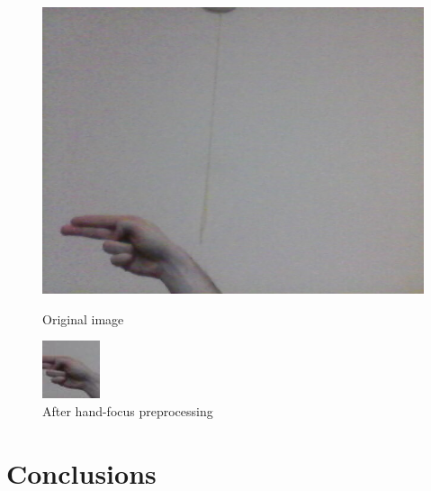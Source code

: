 \documentclass[10pt,twocolumn,letterpaper]{article}
\begin{document}
\begin{figure}
	\includegraphics[width=\linewidth]{asl_h_1.jpg}
	\caption{Original image}
	\label{fig:gesture1}
	\includegraphics[width=\linewidth]{asl_h_1_focused.jpg}
	\caption{After hand-focus preprocessing}
	\label{fig:gesture2}
\end{figure}

\section{Conclusions}
\end{document}
